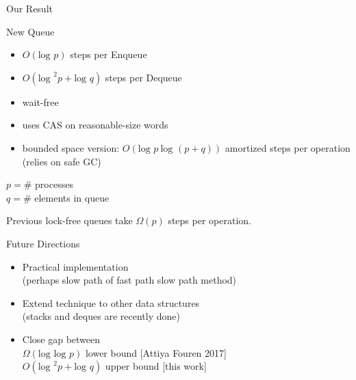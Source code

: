 \documentclass[compress]{beamer}
\newcommand{\op}[1]{\mbox{\sc #1}}
\renewcommand{\log}{\mbox{log }} %
\begin{document}
\begin{frame}{Our Result}

\begin{block}{New Queue}
\begin{itemize}
\item $O(\log p)$ steps per \op{Enqueue}
\item $O(\log^2 p + \log q)$ steps per \op{Dequeue}
\item wait-free
\item uses CAS on reasonable-size words
\item bounded space version: $O(\log p\ \log(p+q))$ amortized steps per operation
(relies on safe GC)
\end{itemize}
\end{block}

$p = \#$ processes\\
$q = \#$ elements in queue

\medskip

Previous lock-free queues take $\Omega(p)$ steps per operation.


\end{frame}

\begin{frame}{Future Directions}

\begin{itemize}
\item
Practical implementation\\
(perhaps slow path of fast path slow path method)
\item
Extend technique to other data structures\\
 (stacks and deques are recently done)
 \item
Close gap between\\
$\Omega(\log \log p)$ lower bound \hfill {\small [Attiya Fouren 2017]}\\
$O(\log^2 p + \log q)$ upper bound \hfill {\small [this work]}

\end{itemize}

\end{frame}
\end{document}
